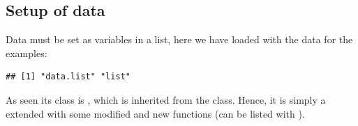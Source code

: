\subsection{Setup of data} \label{sec:setup-of-data}



\noindent Data must be set as variables in a list, here we have
loaded  with the data for the examples:
\begin{knitrout}
\color{fgcolor}\begin{kframe}
\begin{alltt}
\end{alltt}
\begin{verbatim}
## [1] "data.list" "list"
\end{verbatim}
\end{kframe}
\end{knitrout}
As seen its class is , which is inherited from the
 class. Hence, it is simply a  extended with some modified
and new functions (can be listed with ).

